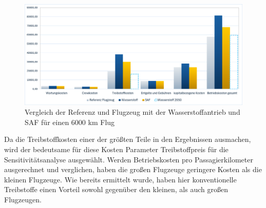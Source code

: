 \begin{figure}[h]
	\centering
	\includegraphics[width=0.9\linewidth]{Bilder/VergleichWA_SAF.png}
	\caption[Betriebskosten]{Vergleich der Referenz und Flugzeug mit der Wasserstoffantrieb und SAF für einen 6000 km Flug}
	\label{vergleichWA_Ref}
\end{figure}

Da die Treibstoffkosten einer der größten Teile in den Ergebnissen ausmachen, 
wird der bedeutsame für diese Kosten Parameter Treibstoffpreis für die Sensitivitätsanalyse ausgewählt.
%
Werden Betriebskosten pro Passagierkilometer ausgerechnet und verglichen, 
haben die großen Flugzeuge geringere Kosten als die kleinen Flugzeuge.
Wie bereits ermittelt wurde, haben hier konventionelle Treibstoffe %
einen Vorteil sowohl gegenüber den kleinen, als auch großen Flugzeugen.
